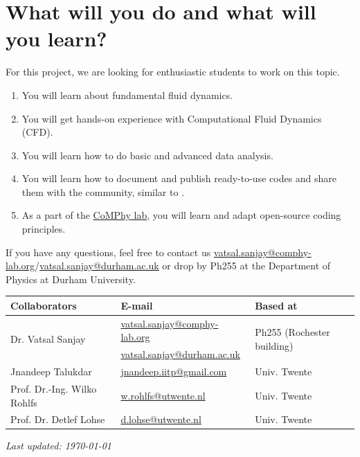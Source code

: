 \documentclass[11pt]{article}
\begin{document}
\section*{What will you do and what will you learn?}
For this project, we are looking for enthusiastic students to work on this topic.
\begin{enumerate}
\itemsep0em
\item You will learn about fundamental fluid dynamics.
\item You will get hands-on experience with Computational Fluid Dynamics (CFD).
\item You will learn how to do basic and advanced data analysis.
\item You will learn how to document and publish ready-to-use codes and share them with the community, similar to \citet{basiliskVatsal, basiliskVatsalDropFilm, basiliskVatsalViscousBouncing}. 
\item As a part of the \href{https://comphy-lab.org}{CoMPhy lab}, you will learn and adapt open-source coding principles. 

\end{enumerate}

If you have any questions, feel free to contact us \href{mailto:vatsal.sanjay@comphy-lab.org}{vatsal.sanjay@comphy-lab.org}/\href{mailto:vatsal.sanjay@durham.ac.uk}{vatsal.sanjay@durham.ac.uk} or drop by Ph255 at the Department of Physics at Durham University.
\begin{center}
\begin{tabular}{|l|l|l|}
\hline \textbf{Collaborators} & \textbf{E-mail} & \textbf{Based at} \\
\hline \multirow{2}{*}{Dr. Vatsal Sanjay} & \href{mailto:vatsal.sanjay@comphy-lab.org}{vatsal.sanjay@comphy-lab.org} & \multirow{2}{*}{Ph255 (Rochester building)} \\
& \href{mailto:vatsal.sanjay@durham.ac.uk}{vatsal.sanjay@durham.ac.uk} & \\
\hline Jnandeep Talukdar & \href{mailto:jnandeep.iitp@gmail.com}{jnandeep.iitp@gmail.com} & Univ. Twente \\
\hline Prof. Dr.-Ing. Wilko Rohlfs   & \href{mailto:w.rohlfs@utwente.nl }{w.rohlfs@utwente.nl }& Univ. Twente \\
\hline Prof. Dr. Detlef Lohse & \href{mailto:d.lohse@utwente.nl}{d.lohse@utwente.nl} & Univ. Twente  \\
\hline
\end{tabular}
\end{center}

\vspace{1em}
\noindent\textit{Last updated: \today}

\printbibliography
\end{document}
